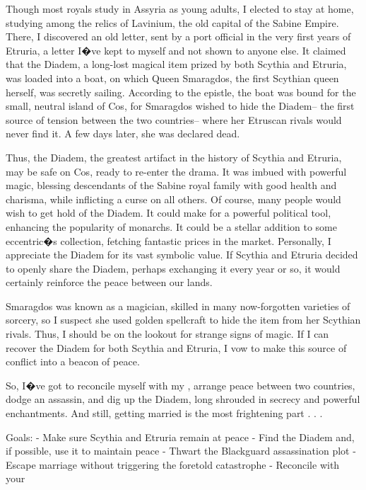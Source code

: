\documentclass[char]{Kos}
\begin{document}
Though most royals study in Assyria as young adults, I elected to stay at home, studying among the relics of Lavinium, the old capital of the Sabine Empire. There, I discovered an old letter, sent by a port official in the very first years of Etruria, a letter I�ve kept to myself and not shown to anyone else. It claimed that the Diadem, a long-lost magical item prized by both Scythia and Etruria, was loaded into a boat, on which Queen Smaragdos, the first Scythian queen herself, was secretly sailing. According to the epistle, the boat was bound for the small, neutral island of Cos, for Smaragdos wished to hide the Diadem-- the first source of tension between the two countries-- where her Etruscan rivals would never find it. A few days later, she was declared dead.

Thus, the Diadem, the greatest artifact in the history of Scythia and Etruria, may be safe on Cos, ready to re-enter the drama. It was imbued with powerful magic, blessing descendants of the Sabine royal family with good health and charisma, while inflicting a curse on all others. Of course, many people would wish to get hold of the Diadem. It could make for a powerful political tool, enhancing the popularity of monarchs. It could be a stellar addition to some eccentric�s collection, fetching fantastic prices in the market. Personally, I appreciate the Diadem for its vast symbolic value. If Scythia and Etruria decided to openly share the Diadem, perhaps exchanging it every year or so, it would certainly reinforce the peace between our lands.

Smaragdos was known as a magician, skilled in many now-forgotten varieties of sorcery, so I suspect she used golden spellcraft to hide the item from her Scythian rivals. Thus, I should be on the lookout for strange signs of magic. If I can recover the Diadem for both Scythia and Etruria, I vow to make this source of conflict into a beacon of peace. 

So, I�ve got to reconcile myself with my \cPoet{\sibling}, arrange peace between two countries, dodge an assassin, and dig up the Diadem, long shrouded in secrecy and powerful enchantments. And still, getting married is the most frightening part . . .

Goals:
- Make sure Scythia and Etruria remain at peace
- Find the Diadem and, if possible, use it to maintain peace
- Thwart the Blackguard assassination plot 
- Escape marriage without triggering the foretold catastrophe
- Reconcile with your \cPoet{\sibling}
\end{document}
